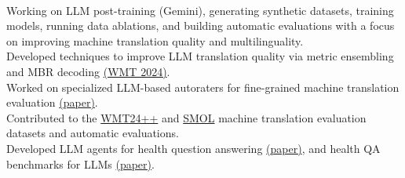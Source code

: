 
\\
Working on LLM post-training (Gemini), generating synthetic datasets, training models, running data ablations, and building automatic evaluations with a focus on improving machine translation quality and multilinguality.\\
Developed techniques to improve LLM translation quality via metric ensembling and MBR decoding \href{https://aclanthology.org/2024.wmt-1.109.pdf}{(WMT 2024)}.\\
Worked on specialized LLM-based autoraters for fine-grained machine translation evaluation \href{https://arxiv.org/pdf/2411.15387}{(paper)}.\\
Contributed to the \href{https://arxiv.org/pdf/2502.12404}{WMT24++} and \href{https://arxiv.org/pdf/2502.12301}{SMOL} machine translation evaluation datasets and automatic evaluations.\\
Developed LLM agents for health question answering \href{https://arxiv.org/pdf/2406.06464}{(paper)}, and health QA benchmarks for LLMs \href{https://arxiv.org/pdf/2305.15525}{(paper)}.\\

\vspace{-1mm}

